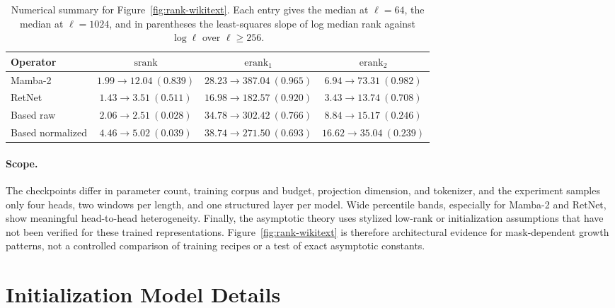 \documentclass{article}
\newcommand{\srank}{\operatorname{srank}}
\newcommand{\erank}{\operatorname{erank}}
\theoremstyle{definition}
\theoremstyle{remark}
\begin{document}
\begin{table}[h]
  \centering
  \scriptsize
  {\setlength{\tabcolsep}{3pt}
  \begin{tabular}{lccc}
    \hline
    Operator & $\srank$ & $\erank_1$ & $\erank_2$ \\
    \hline
    Mamba-2
      & $1.99\!\to\!12.04\ (0.839)$
      & $28.23\!\to\!387.04\ (0.965)$
      & $6.94\!\to\!73.31\ (0.982)$ \\
    RetNet
      & $1.43\!\to\!3.51\ (0.511)$
      & $16.98\!\to\!182.57\ (0.920)$
      & $3.43\!\to\!13.74\ (0.708)$ \\
    Based raw
      & $2.06\!\to\!2.51\ (0.028)$
      & $34.78\!\to\!302.42\ (0.766)$
      & $8.84\!\to\!15.17\ (0.246)$ \\
    Based normalized
      & $4.46\!\to\!5.02\ (0.039)$
      & $38.74\!\to\!271.50\ (0.693)$
      & $16.62\!\to\!35.04\ (0.239)$ \\
    \hline
  \end{tabular}}
  \caption{Numerical summary for Figure~\ref{fig:rank-wikitext}.  Each entry
  gives the median at $\ell=64$, the median at $\ell=1024$, and in parentheses
  the least-squares slope of log median rank against $\log\ell$ over
  $\ell\geq256$.}
  \label{tab:trained-rank-summary}
\end{table}

\paragraph{Scope.}
The checkpoints differ in parameter count, training corpus and budget,
projection dimension, and tokenizer, and the experiment samples only four
heads, two windows per length, and one structured layer per model.  Wide
percentile bands, especially for Mamba-2 and RetNet, show meaningful
head-to-head heterogeneity.  Finally, the asymptotic theory uses stylized
low-rank or initialization assumptions that have not been verified for these
trained representations.  Figure~\ref{fig:rank-wikitext} is therefore
architectural evidence for mask-dependent growth patterns, not a controlled
comparison of training recipes or a test of exact asymptotic constants.

\section{Initialization Model Details}
\label{app:init-details}
\end{document}
